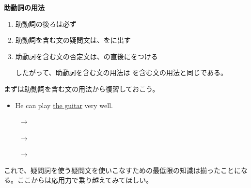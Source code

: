     \begin{theorembox}{\textbf{助動詞の用法}}
        \begin{enumerate}
            \item 助動詞の後ろは必ず
            \item 助動詞を含む文の疑問文は、をに出す
            \item 助動詞を含む文の否定文は、の直後にをつける

            したがって、助動詞を含む文の用法は を含む文の用法と同じである。
        \end{enumerate}
    \end{theorembox}

    まずは助動詞を含む文の用法から復習しておこう。

    \begin{itemize}
        \item He can play \underline{the guitar} very well.
        \par\vspace{0.3em}
        \noindent{}\ $\longrightarrow$\ 
        \par\vspace{0.5em}
        \noindent{}\ $\longrightarrow$\ 
        \par\vspace{0.5em}
        \noindent{}\ $\longrightarrow$\ 
    \end{itemize}
\vspace{1.5em}

    これで、疑問詞を使う疑問文を使いこなすための最低限の知識は揃ったことになる。ここからは応用力で乗り越えてみてほしい。

